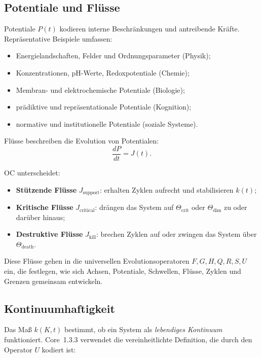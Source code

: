 \subsection{Potentiale und Flüsse}

Potentiale \(P(t)\) kodieren interne Beschränkungen und antreibende Kräfte.
Repräsentative Beispiele umfassen:

\begin{itemize}
    \item Energielandschaften, Felder und Ordnungsparameter (Physik);
    \item Konzentrationen, pH-Werte, Redoxpotentiale (Chemie);
    \item Membran- und elektrochemische Potentiale (Biologie);
    \item prädiktive und repräsentationale Potentiale (Kognition);
    \item normative und institutionelle Potentiale (soziale Systeme).
\end{itemize}

Flüsse beschreiben die Evolution von Potentialen:
\[
\frac{dP}{dt} = J(t).
\]

OC unterscheidet:

\begin{itemize}
    \item \textbf{Stützende Flüsse} \(J_{\mathrm{support}}\): erhalten Zyklen aufrecht und stabilisieren \(k(t)\);
    \item \textbf{Kritische Flüsse} \(J_{\mathrm{critical}}\): drängen das System auf \(\Theta_{\mathrm{crit}}\) oder \(\Theta_{\mathrm{dim}}\) zu oder darüber hinaus;
    \item \textbf{Destruktive Flüsse} \(J_{\mathrm{kill}}\): brechen Zyklen auf oder zwingen das System über \(\Theta_{\mathrm{death}}\).
\end{itemize}

Diese Flüsse gehen in die universellen Evolutionsoperatoren \(F, G, H, Q, R, S, U\) ein, die festlegen, wie sich Achsen, Potentiale, Schwellen, Flüsse, Zyklen und Grenzen gemeinsam entwickeln.

\subsection{Kontinuumhaftigkeit}

Das Maß \(k(K,t)\) bestimmt, ob ein System als \emph{lebendiges Kontinuum} funktioniert.
Core~1.3.3 verwendet die vereinheitlichte Definition, die durch den Operator \(U\) kodiert ist:

